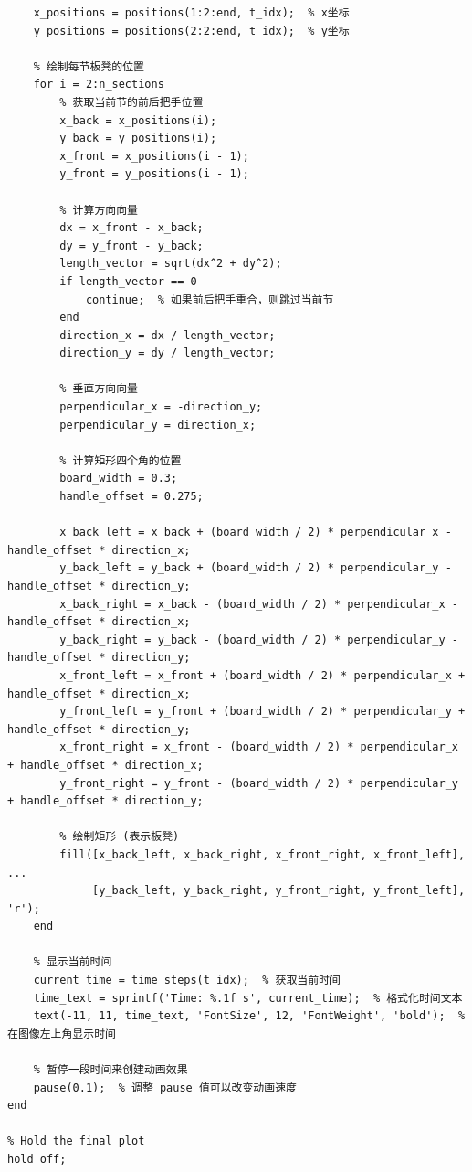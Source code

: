 \documentclass{cumcmthesis1}
\begin{document}
\begin{lstlisting}[caption={对问题4整个调头过程进行仿真模拟的代码}, label={lst:ninth_code}]
    % 获取当前时间步的所有板凳位置信息
    x_positions = positions(1:2:end, t_idx);  % x坐标
    y_positions = positions(2:2:end, t_idx);  % y坐标
    
    % 绘制每节板凳的位置
    for i = 2:n_sections
        % 获取当前节的前后把手位置
        x_back = x_positions(i);
        y_back = y_positions(i);
        x_front = x_positions(i - 1);
        y_front = y_positions(i - 1);
        
        % 计算方向向量
        dx = x_front - x_back;
        dy = y_front - y_back;
        length_vector = sqrt(dx^2 + dy^2);
        if length_vector == 0
            continue;  % 如果前后把手重合，则跳过当前节
        end
        direction_x = dx / length_vector;
        direction_y = dy / length_vector;
        
        % 垂直方向向量
        perpendicular_x = -direction_y;
        perpendicular_y = direction_x;
        
        % 计算矩形四个角的位置
        board_width = 0.3;
        handle_offset = 0.275;
        
        x_back_left = x_back + (board_width / 2) * perpendicular_x - handle_offset * direction_x;
        y_back_left = y_back + (board_width / 2) * perpendicular_y - handle_offset * direction_y;
        x_back_right = x_back - (board_width / 2) * perpendicular_x - handle_offset * direction_x;
        y_back_right = y_back - (board_width / 2) * perpendicular_y - handle_offset * direction_y;
        x_front_left = x_front + (board_width / 2) * perpendicular_x + handle_offset * direction_x;
        y_front_left = y_front + (board_width / 2) * perpendicular_y + handle_offset * direction_y;
        x_front_right = x_front - (board_width / 2) * perpendicular_x + handle_offset * direction_x;
        y_front_right = y_front - (board_width / 2) * perpendicular_y + handle_offset * direction_y;
        
        % 绘制矩形 (表示板凳)
        fill([x_back_left, x_back_right, x_front_right, x_front_left], ...
             [y_back_left, y_back_right, y_front_right, y_front_left], 'r');
    end
    
    % 显示当前时间
    current_time = time_steps(t_idx);  % 获取当前时间
    time_text = sprintf('Time: %.1f s', current_time);  % 格式化时间文本
    text(-11, 11, time_text, 'FontSize', 12, 'FontWeight', 'bold');  % 在图像左上角显示时间
    
    % 暂停一段时间来创建动画效果
    pause(0.1);  % 调整 pause 值可以改变动画速度
end

% Hold the final plot
hold off;

\end{lstlisting}
\end{document}
